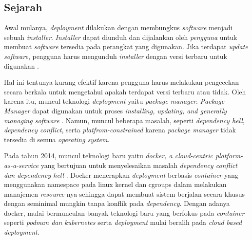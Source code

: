 \subsection{Sejarah}

Awal mulanya, \textit{deployment} dilakukan dengan membungkus \textit{software} menjadi sebuah \textit{installer}. \textit{Installer} dapat diunduh dan dijalankan oleh \textit{pengguna} untuk membuat \textit{software} tersedia pada perangkat yang digunakan. Jika terdapat \textit{update software}, pengguna harus mengunduh \textit{installer} dengan versi terbaru untuk digunakan \parencite{softwareDeploymentCarzaniga1998characterization}.

Hal ini tentunya kurang efektif karena pengguna harus melakukan pengecekan secara berkala untuk mengetahui apakah terdapat versi terbaru atau tidak. Oleh karena itu, muncul teknologi \textit{deployment} yaitu \textit{package manager}. \textit{Package Manager} dapat digunakan untuk proses \textit{installing, updating, and generally managing software} \parencite{softwareDeploymentCarzaniga1998characterization}. Namun, muncul beberapa masalah, seperti \textit{dependency hell}, \textit{dependency conflict}, serta \textit{platfrom-constrained} karena \textit{package manager} tidak tersedia di semua \textit{operating system}.

Pada tahun 2014, muncul teknologi baru yaitu \textit{docker, a cloud-centric platform-as-a-service} yang bertujuan untuk menyelesaikan masalah \textit{dependency conflict dan dependency hell} \parencite{merkel2014docker}. Docker menerapkan \textit{deployment} berbasis \textit{container} yang menggunakan namespace pada linux kernel dan cgroups dalam melakukan manajemen \textit{resource}-nya sehingga dapat membuat sistem berjalan secara khusus dengan seminimal mungkin tanpa konflik pada \textit{dependency}. Dengan adanya docker, mulai bermunculan banyak teknologi baru yang berfokus pada \textit{container} seperti \textit{podman dan kubernetes} serta \textit{deployment} mulai beralih pada \textit{cloud based deployment}.